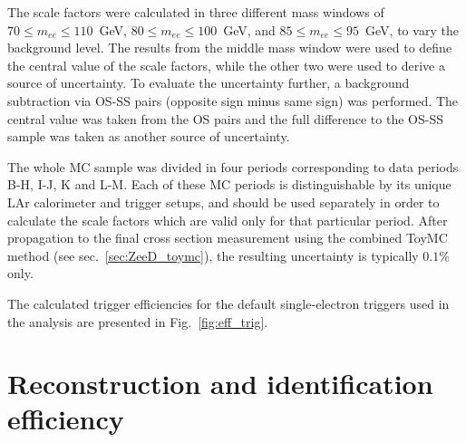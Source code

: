The scale factors were calculated in three different mass windows of $70 \le m_{ee} \le 110$~GeV, $80 \le m_{ee} \le 100$~GeV, and $85 \le m_{ee} \le 95$~GeV, to vary the background level. The results from the middle mass window were used to define the central value of the scale factors, while the other two were used to derive a source of uncertainty. To evaluate the uncertainty further, a background subtraction via OS-SS pairs (opposite sign minus same sign) was performed. The central value was taken from the OS pairs and the full difference to the OS-SS sample was taken as another source of uncertainty.

The whole MC sample was divided in four periods corresponding to data periods B-H, I-J, K and L-M. Each of these MC periods is distinguishable by its unique LAr calorimeter and trigger setups, and should be used separately in order to calculate the scale factors which are valid only for that particular period. After propagation to the final cross section measurement using the combined ToyMC method (see sec.~\ref{sec:ZeeD_toymc}), the resulting uncertainty is typically $0.1\%$ only.

The calculated trigger efficiencies for the default single-electron triggers used in the analysis are presented in Fig.~\ref{fig:eff_trig}.

\begin{figure}
\end{figure}

\section{Reconstruction and identification efficiency}

